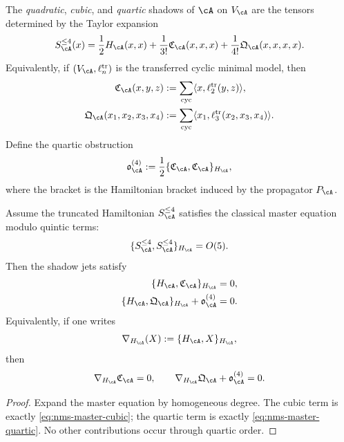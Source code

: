 \begin{definition}
\label{def:nms-shadow-jets}
The \emph{quadratic}, \emph{cubic}, and \emph{quartic} shadows of $\cA$ on $V_{\cA}$ are the tensors determined by the Taylor expansion
\begin{equation}
\label{eq:nms-shadow-potential-expansion}
S_{\cA}^{\le 4}(x)
=
\frac12H_{\cA}(x,x)
+
\frac1{3!}\mathfrak C_{\cA}(x,x,x)
+
\frac1{4!}\mathfrak Q_{\cA}(x,x,x,x).
\end{equation}
Equivalently, if $(V_{\cA},\ell_n^{\mathrm{tr}})$ is the transferred cyclic minimal model, then
\begin{align}
\mathfrak C_{\cA}(x,y,z)
&:= \sum_{\mathrm{cyc}}\langle x,\ell_2^{\mathrm{tr}}(y,z)\rangle,
\label{eq:nms-cubic-shadow}
\\
\mathfrak Q_{\cA}(x_1,x_2,x_3,x_4)
&:= \sum_{\mathrm{cyc}}\langle x_1,\ell_3^{\mathrm{tr}}(x_2,x_3,x_4)\rangle.
\label{eq:nms-quartic-shadow}
\end{align}
Define the quartic obstruction
\begin{equation}
\label{eq:nms-quartic-obstruction-def}
\mathfrak o_{\cA}^{(4)}
:=
\frac12\{\mathfrak C_{\cA},\mathfrak C_{\cA}\}_{H_{\cA}},
\end{equation}
where the bracket is the Hamiltonian bracket induced by the propagator $P_{\cA}$.
\end{definition}

\begin{theorem}
\label{thm:nms-shadow-master-equations}
Assume the truncated Hamiltonian $S_{\cA}^{\le 4}$ satisfies the classical master equation modulo quintic terms:
\[
\{S_{\cA}^{\le 4},S_{\cA}^{\le 4}\}_{H_{\cA}}=O(5).
\]
Then the shadow jets satisfy
\begin{align}
\{H_{\cA},\mathfrak C_{\cA}\}_{H_{\cA}} &= 0,
\label{eq:nms-master-cubic}
\\
\{H_{\cA},\mathfrak Q_{\cA}\}_{H_{\cA}} + \mathfrak o_{\cA}^{(4)} &= 0.
\label{eq:nms-master-quartic}
\end{align}
Equivalently, if one writes
\[
\nabla_{H_{\cA}}(X):=\{H_{\cA},X\}_{H_{\cA}},
\]
then
\[
\nabla_{H_{\cA}}\mathfrak C_{\cA}=0,
\qquad
\nabla_{H_{\cA}}\mathfrak Q_{\cA}+\mathfrak o_{\cA}^{(4)}=0.
\]
\end{theorem}

\begin{proof}
Expand the master equation by homogeneous degree. The cubic term is exactly \eqref{eq:nms-master-cubic}; the quartic term is exactly \eqref{eq:nms-master-quartic}. No other contributions occur through quartic order.\qedhere
\end{proof}

